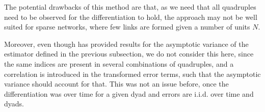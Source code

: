 The potential drawbacks of this method are that, as we need that all quadruples need to be observed for the differentiation to hold, the approach may not be well suited for sparse networks, where few links are formed given a number of units $N$.

Moreover, even though \cite{kyriazidou1997estimation} has provided results for the asymptotic variance of the estimator defined in the previous subsection, we do not consider this here, since the same indices are present in several combinations of quadruples, and a correlation is introduced in the transformed error terms, such that the asymptotic variance should account for that. This was not an issue before, once the differentiation was over time for a given dyad and errors are i.i.d. over time and dyads.


